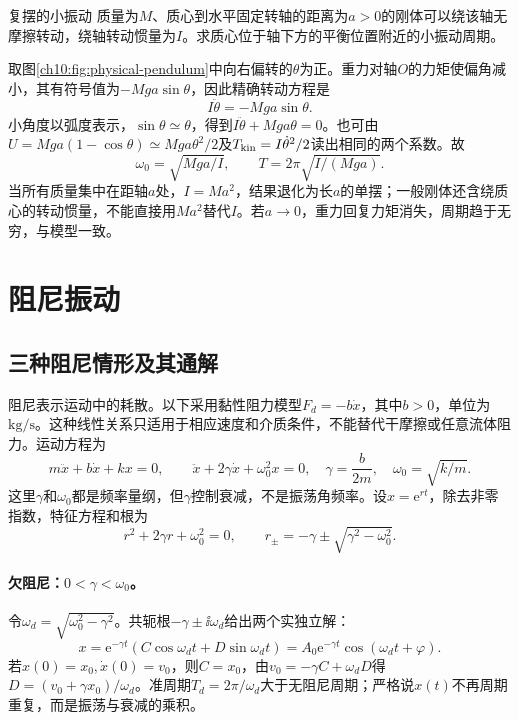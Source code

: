 \begin{origexamplebox}{复摆的小振动}\label{ch10:ex:physical-pendulum}
质量为$M$、质心到水平固定转轴的距离为$a>0$的刚体可以绕该轴无摩擦转动，绕轴转动惯量为$I$。求质心位于轴下方的平衡位置附近的小振动周期。

\ThQPhysicalPendulum
\end{origexamplebox}
\begin{xesolution}
取图\ref{ch10:fig:physical-pendulum}中向右偏转的$\theta$为正。重力对轴$O$的力矩使偏角减小，其有符号值为$-Mga\sin\theta$，因此精确转动方程是
\[
 I\ddot\theta=-Mga\sin\theta.
\]
\chTenPendulumFigure
小角度以弧度表示，$\sin\theta\simeq\theta$，得到$I\ddot\theta+Mga\theta=0$。也可由$U=Mga(1-\cos\theta)\simeq Mga\theta^2/2$及$T_{\rm kin}=I\dot\theta^2/2$读出相同的两个系数。故
\[
 \boxed{\omega_0=\sqrt{Mga/I}},\qquad
 \boxed{T=2\pi\sqrt{I/(Mga)}}.
\]
当所有质量集中在距轴$a$处，$I=Ma^2$，结果退化为长$a$的单摆；一般刚体还含绕质心的转动惯量，不能直接用$Ma^2$替代$I$。若$a\to0$，重力回复力矩消失，周期趋于无穷，与模型一致。
\end{xesolution}

\section{阻尼振动}\label{ch10:sec:damping}
\subsection{三种阻尼情形及其通解}
阻尼表示运动中的耗散。以下采用黏性阻力模型$F_d=-b\dot x$，其中$b>0$，单位为$\mathrm{kg/s}$。这种线性关系只适用于相应速度和介质条件，不能替代干摩擦或任意流体阻力。运动方程为
\begin{equation}\label{ch10:eq:damping}
 m\ddot x+b\dot x+kx=0,
 \qquad\ddot x+2\gamma\dot x+\omega_0^2x=0,
 \quad\gamma=\frac{b}{2m},\quad\omega_0=\sqrt{k/m}.
\end{equation}
这里$\gamma$和$\omega_0$都是频率量纲，但$\gamma$控制衰减，不是振荡角频率。设$x=\mathrm e^{rt}$，除去非零指数，特征方程和根为
\[
 r^2+2\gamma r+\omega_0^2=0,
 \qquad r_\pm=-\gamma\pm\sqrt{\gamma^2-\omega_0^2}.
\]
\paragraph{欠阻尼：$0<\gamma<\omega_0$。}
令$\omega_d=\sqrt{\omega_0^2-\gamma^2}$。共轭根$-\gamma\pm\ii\omega_d$给出两个实独立解：
\begin{equation}\label{ch10:eq:under}
 x=\mathrm e^{-\gamma t}(C\cos\omega_dt+D\sin\omega_dt)
 =A_0\mathrm e^{-\gamma t}\cos(\omega_dt+\varphi).
\end{equation}
若$x(0)=x_0,\dot x(0)=v_0$，则$C=x_0$，由$v_0=-\gamma C+\omega_dD$得$D=(v_0+\gamma x_0)/\omega_d$。准周期$T_d=2\pi/\omega_d$大于无阻尼周期；严格说$x(t)$不再周期重复，而是振荡与衰减的乘积。

